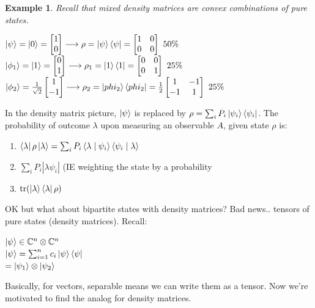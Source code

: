 \documentclass[12pt]{article}
\theoremstyle{plain}
\theoremstyle{nonumberplain}
\theoremstyle{plain}
\newtheorem{example}[lemma]{Example}
\theoremstyle{nonumberplain}
\newcommand\1{{\bf 1}}
\newcommand{\bmat}[1]{\begin{bmatrix*} #1 \end{bmatrix*}} %
\newcommand{\C}{\mathbb{C}} %
\newcommand{\<}{\left\langle}
\renewcommand{\>}{\right\rangle}
\newcommand{\inp}[2]{\left\langle#1\mid #2\right\rangle} %
\newcommand{\abs}[1]{\left\lvert #1 \right\rvert} %
\begin{document}
\begin{example}
Recall that mixed density matrices are convex combinations of pure states.
\begin{center}
$\ket{\psi}=\ket{0}=\bmat{1 \\ 0}\longrightarrow\rho=\ket{\psi}\bra{\psi}=\bmat{1 & 0 \\ 0 & 0} \text{ }50\%$\\
$\ket{\phi_1}=\ket{1}=\bmat{0 \\ 1}\longrightarrow\rho_1=\ket{1}\bra{1}=\bmat{0 & 0 \\ 0 & 1}\text{ }25\%$\\
$\ket{\phi_2}=\frac{1}{\sqrt{2}}\bmat{1 \\ -1}\longrightarrow\rho_2=\ket{phi_2}\bra{phi_2}=\frac{1}{2}\bmat{1 & -1 \\ -1 & 1} \text{ } 25\%$
\end{center}
\end{example}
In the density matrix picture, $\ket{\psi}$ is replaced by $\rho=\sum_iP_i\ket{\psi_i}\bra{\psi_i}$. The probability of outcome $\lambda$ upon measuring an observable $A$, given state $\rho$ is:
\begin{enumerate}
\item $\bra{\lambda}\rho\ket{\lambda}=\sum_iP_i\inp{\lambda}{\psi_i}\inp{\psi_i}{\lambda}$
\item $\sum_iP_i\abs{{\lambda}{\psi_i}}$ (IE weighting the state by a probability
\item $\text{tr}(\ket{\lambda}\bra{\lambda}\rho)$
\end{enumerate}
OK but what about bipartite states with density matrices? Bad news.. tensors of pure states (density matrices). Recall:\\
\begin{center}
$\ket{\psi}\in\C^n\otimes\C^n$\\
$\ket{\psi}=\sum^n_{i=1}c_i\ket{\psi}\bra{\psi}$\\
$=\ket{\psi_1}\otimes\ket{\psi_2}$
\end{center}
Basically, for vectors, separable means we can write them as a tensor. Now we're motivated to find the analog for density matrices.
\end{document}
